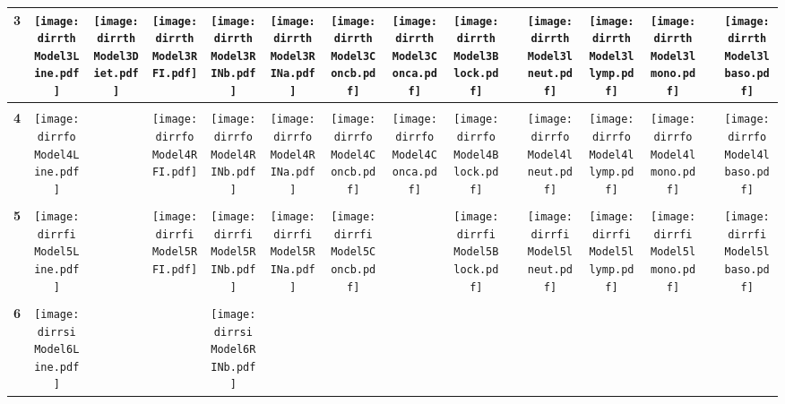 \documentclass[landscape]{article}
\def \dirrth {/run/user/1000/gvfs/smb-share:server=cyfiles.iastate.edu,share=09/22/ntyet/R/RA/Data/RFI-newdata/resultsimulation/Model3.Line.Diet.RFI.Concb.RINb.Conca.RINa.lneut.llymp.lmono.lbaso.Block/}
\def \dirrfo {/run/user/1000/gvfs/smb-share:server=cyfiles.iastate.edu,share=09/22/ntyet/R/RA/Data/RFI-newdata/resultsimulation/Model4.Line.RFI.Concb.RINb.Conca.RINa.lneut.llymp.lmono.lbaso.Block/}
\def \dirrfi {/run/user/1000/gvfs/smb-share:server=cyfiles.iastate.edu,share=09/22/ntyet/R/RA/Data/RFI-newdata/resultsimulation/Model5.Line.RFI.Concb.RINb.RINa.lneut.llymp.lmono.lbaso.Block/}
\def \dirrsi{/run/user/1000/gvfs/smb-share:server=cyfiles.iastate.edu,share=09/22/ntyet/R/RA/Data/RFI-newdata/resultsimulation/Model6.Line.Concb.RINb.RINa.lneut.llymp.lmono.lbaso.Block/}
\begin{document}
\begin{table}
\begin{tabular}{ccccccccccccccc}
      {\Huge \textbf{3}} 
      &\texttt{[image: \\dirrth Model3Line.pdf]}
      &\texttt{[image: \\dirrth Model3Diet.pdf]}
      &\texttt{[image: \\dirrth Model3RFI.pdf]}
      &\texttt{[image: \\dirrth Model3RINb.pdf]}
      &\texttt{[image: \\dirrth Model3RINa.pdf]}
      &\texttt{[image: \\dirrth Model3Concb.pdf]}
      &\texttt{[image: \\dirrth Model3Conca.pdf]}
      &\texttt{[image: \\dirrth Model3Block.pdf]}
      &
      &\texttt{[image: \\dirrth Model3lneut.pdf]}
      &\texttt{[image: \\dirrth Model3llymp.pdf]}
      &\texttt{[image: \\dirrth Model3lmono.pdf]}
      &
      &\texttt{[image: \\dirrth Model3lbaso.pdf]}
     \\[3.5pt]
     \hline
     \\[3.5pt]
     {\Huge \textbf{4}} 
      &\texttt{[image: \\dirrfo Model4Line.pdf]}
      &
      &\texttt{[image: \\dirrfo Model4RFI.pdf]}
      &\texttt{[image: \\dirrfo Model4RINb.pdf]}
      &\texttt{[image: \\dirrfo Model4RINa.pdf]}
      &\texttt{[image: \\dirrfo Model4Concb.pdf]}
      &\texttt{[image: \\dirrfo Model4Conca.pdf]}
      &\texttt{[image: \\dirrfo Model4Block.pdf]}
      &
      &\texttt{[image: \\dirrfo Model4lneut.pdf]}
      &\texttt{[image: \\dirrfo Model4llymp.pdf]}
      &\texttt{[image: \\dirrfo Model4lmono.pdf]}
      &
      &\texttt{[image: \\dirrfo Model4lbaso.pdf]}
     \\[3.5pt]
     \hline
     \\[3.5pt]
     {\Huge \textbf{5}} 
      &\texttt{[image: \\dirrfi Model5Line.pdf]}
      &
      &\texttt{[image: \\dirrfi Model5RFI.pdf]}
      &\texttt{[image: \\dirrfi Model5RINb.pdf]}
      &\texttt{[image: \\dirrfi Model5RINa.pdf]}
      &\texttt{[image: \\dirrfi Model5Concb.pdf]}
      &
      &\texttt{[image: \\dirrfi Model5Block.pdf]}
      &
      &\texttt{[image: \\dirrfi Model5lneut.pdf]}
      &\texttt{[image: \\dirrfi Model5llymp.pdf]}
      &\texttt{[image: \\dirrfi Model5lmono.pdf]}
      &
      &\texttt{[image: \\dirrfi Model5lbaso.pdf]}
     \\[3.5pt]
     \hline
     \\[3.5pt]
     {\Huge \textbf{6}} 
      &\texttt{[image: \\dirrsi Model6Line.pdf]}
      &
      &
      &\texttt{[image: \\dirrsi Model6RINb.pdf]}

\end{tabular}
\end{table}
\end{document}

